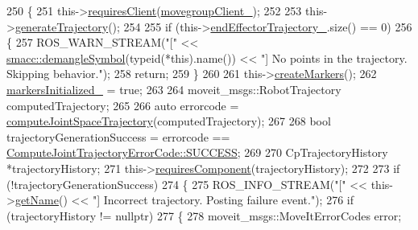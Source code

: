 \begin{DoxyCode}
250     \{
251         this->\hyperlink{classsmacc_1_1ISmaccClientBehavior_a32b16e99e3b4cb289414203dc861a440}{requiresClient}(\hyperlink{classcl__move__group__interface_1_1CbMoveEndEffectorTrajectory_aea650d3e7836125b32be97392b71a7f3}{movegroupClient\_});
252 
253         this->\hyperlink{classcl__move__group__interface_1_1CbMoveEndEffectorTrajectory_aeae938ab66e18ab7d2fb2427bc83647b}{generateTrajectory}();
254 
255         \textcolor{keywordflow}{if} (this->\hyperlink{classcl__move__group__interface_1_1CbMoveEndEffectorTrajectory_ae13dfd31ea3660646e03882f0c2c29f0}{endEffectorTrajectory\_}.size() == 0)
256         \{
257             ROS\_WARN\_STREAM(\textcolor{stringliteral}{"["} << \hyperlink{namespacesmacc_1_1introspection_a2f495108db3e57604d8d3ff5ef030302}{smacc::demangleSymbol}(\textcolor{keyword}{typeid}(*this).name()) << \textcolor{stringliteral}{"]
       No points in the trajectory. Skipping behavior."});
258             \textcolor{keywordflow}{return};
259         \}
260 
261         this->\hyperlink{classcl__move__group__interface_1_1CbMoveEndEffectorTrajectory_a442efa1d5bc9e9a16f74ecd31b13d9b5}{createMarkers}();
262         \hyperlink{classcl__move__group__interface_1_1CbMoveEndEffectorTrajectory_ac140a7f0adfb20f1e2900a5c8cd2ca5b}{markersInitialized\_} = \textcolor{keyword}{true};
263 
264         moveit\_msgs::RobotTrajectory computedTrajectory;
265 
266         \textcolor{keyword}{auto} errorcode = \hyperlink{classcl__move__group__interface_1_1CbMoveEndEffectorTrajectory_a485057c052729edd3e8303440b7ada66}{computeJointSpaceTrajectory}(computedTrajectory);
267 
268         \textcolor{keywordtype}{bool} trajectoryGenerationSuccess = errorcode == 
      \hyperlink{namespacecl__move__group__interface_ae5fc1caf9a16ae5ad1c97c2e137a7017ad0749aaba8b833466dfcbb0428e4f89c}{ComputeJointTrajectoryErrorCode::SUCCESS};
269 
270         CpTrajectoryHistory *trajectoryHistory;
271         this->\hyperlink{classsmacc_1_1ISmaccClientBehavior_a19c6d658c8e809bb93bfdc9b639a3ac3}{requiresComponent}(trajectoryHistory);
272 
273         \textcolor{keywordflow}{if} (!trajectoryGenerationSuccess)
274         \{
275             ROS\_INFO\_STREAM(\textcolor{stringliteral}{"["} << this->\hyperlink{classsmacc_1_1ISmaccClientBehavior_a18e4bec9460b010f2894c0f7e7064a34}{getName}() << \textcolor{stringliteral}{"] Incorrect trajectory. Posting failure
       event."});
276             \textcolor{keywordflow}{if} (trajectoryHistory != \textcolor{keyword}{nullptr})
277             \{
278                 moveit\_msgs::MoveItErrorCodes error;

\end{DoxyCode}
